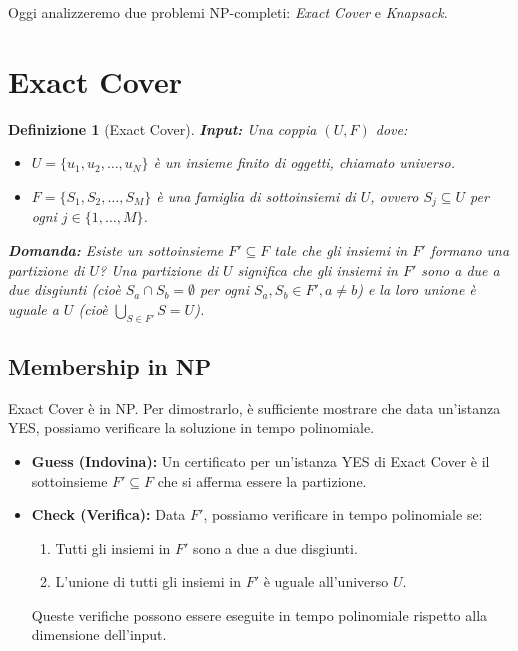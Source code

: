 \documentclass[a4paper]{article}
\newtheorem{definition}{Definizione}
\begin{document}
Oggi analizzeremo due problemi NP-completi: \emph{Exact Cover} e \emph{Knapsack}.

\section{Exact Cover}

\begin{definition}[Exact Cover]
\textbf{Input:}
Una coppia $(U, F)$ dove:
\begin{itemize}
    \item $U = \{u_1, u_2, \ldots, u_N\}$ è un insieme finito di oggetti, chiamato \emph{universo}.
    \item $F = \{S_1, S_2, \ldots, S_M\}$ è una famiglia di sottoinsiemi di $U$, ovvero $S_j \subseteq U$ per ogni $j \in \{1, \ldots, M\}$.
\end{itemize}
\textbf{Domanda:} Esiste un sottoinsieme $F' \subseteq F$ tale che gli insiemi in $F'$ formano una \emph{partizione} di $U$?
Una partizione di $U$ significa che gli insiemi in $F'$ sono a due a due disgiunti (cioè $S_a \cap S_b = \emptyset$ per ogni $S_a, S_b \in F', a \neq b$) e la loro unione è uguale a $U$ (cioè $\bigcup_{S \in F'} S = U$).
\end{definition}

\subsection{Membership in NP}
Exact Cover è in NP. Per dimostrarlo, è sufficiente mostrare che data un'istanza YES, possiamo verificare la soluzione in tempo polinomiale.
\begin{itemize}
    \item \textbf{Guess (Indovina):} Un certificato per un'istanza YES di Exact Cover è il sottoinsieme $F' \subseteq F$ che si afferma essere la partizione.
    \item \textbf{Check (Verifica):} Data $F'$, possiamo verificare in tempo polinomiale se:
        \begin{enumerate}
            \item Tutti gli insiemi in $F'$ sono a due a due disgiunti.
            \item L'unione di tutti gli insiemi in $F'$ è uguale all'universo $U$.
        \end{enumerate}
    Queste verifiche possono essere eseguite in tempo polinomiale rispetto alla dimensione dell'input.
\end{itemize}
\end{document}
